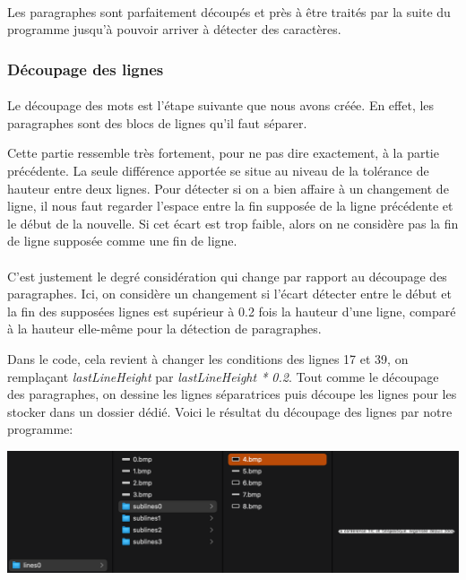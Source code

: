 \documentclass{article}
\begin{document}
	\paragraph{}
	Les paragraphes sont parfaitement découpés et près à être traités par la suite du programme jusqu'à pouvoir arriver à détecter des caractères.
	
	\subsubsection{Découpage des lignes}
	\paragraph{}
	Le découpage des mots est l'étape suivante que nous avons créée. En effet, les paragraphes sont des blocs de lignes qu'il faut séparer.
	\par Cette partie ressemble très fortement, pour ne pas dire exactement, à la partie précédente. La seule différence apportée se situe au niveau de la tolérance de hauteur entre deux lignes. Pour détecter si on a bien affaire à un changement de ligne, il nous faut regarder l'espace entre la fin supposée de la ligne précédente et le début de la nouvelle. Si cet écart est trop faible, alors on ne considère pas la fin de ligne supposée comme une fin de ligne.
	
	\paragraph{}
	C'est justement le degré considération qui change par rapport au découpage des paragraphes. Ici, on considère un changement si l'écart détecter entre le début et la fin des supposées lignes est supérieur à 0.2 fois la hauteur d'une ligne, comparé à la hauteur elle-même pour la détection de paragraphes.
	\par Dans le code, cela revient à changer les conditions des lignes 17 et 39, on remplaçant \textit{lastLineHeight} par \textit{lastLineHeight * 0.2}. Tout comme le découpage des paragraphes, on dessine les lignes séparatrices puis découpe les lignes pour les stocker dans un dossier dédié. Voici le résultat du découpage des lignes par notre programme: \\
	
	\begin{center}
		\includegraphics[scale=0.5]{cutLines}
	\end{center}
	
\end{document}

